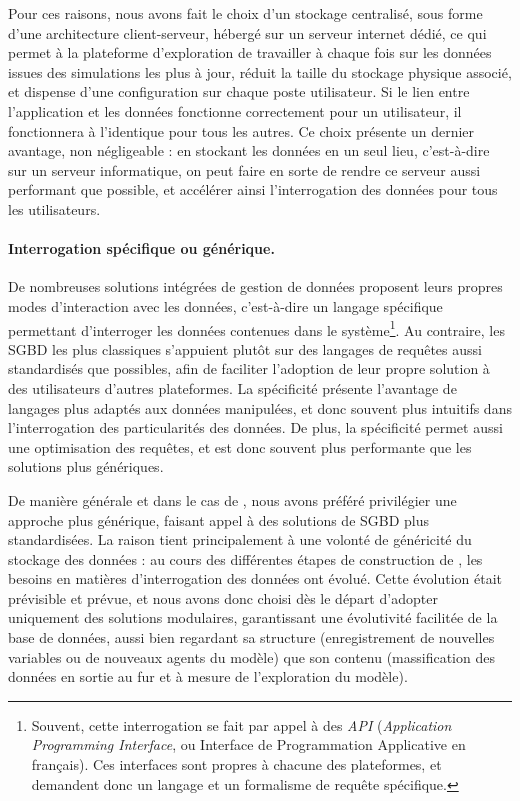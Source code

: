 Pour ces raisons, nous avons fait le choix d'un stockage centralisé, sous forme d'une architecture \og client-serveur\fg{}, hébergé sur un serveur internet dédié, ce qui permet à la plateforme d'exploration de travailler à chaque fois sur les données issues des simulations les plus à jour, réduit la taille du stockage physique associé, et dispense d'une configuration sur chaque poste utilisateur.
Si le lien entre l'application et les données fonctionne correctement pour un utilisateur, il fonctionnera à l'identique pour tous les autres.
Ce choix présente un dernier avantage, non négligeable :
en stockant les données en un seul lieu, c'est-à-dire sur un serveur informatique, on peut faire en sorte de rendre ce serveur aussi performant que possible, et accélérer ainsi l'interrogation des données pour tous les utilisateurs.

\paragraph{Interrogation spécifique ou générique.}\label{par:interrogation-generique}

De nombreuses solutions intégrées de gestion de données proposent leurs propres modes d'interaction avec les données, c'est-à-dire un langage spécifique permettant d'interroger les données contenues dans le système\footnote{
	Souvent, cette interrogation se fait par appel à des \textit{API} (\textit{Application Programming Interface}, ou Interface de Programmation Applicative en français).
	Ces interfaces sont propres à chacune des plateformes, et demandent donc un langage et un formalisme de requête spécifique.
}.
Au contraire, les SGBD les plus classiques s'appuient plutôt sur des langages de requêtes aussi standardisés que possibles, afin de faciliter l'adoption de leur propre solution à des utilisateurs d'autres plateformes.
La spécificité présente l'avantage de langages plus adaptés aux données manipulées, et donc souvent plus intuitifs dans l'interrogation des particularités des données.
De plus, la spécificité permet aussi une optimisation des requêtes, et est donc souvent plus performante que les solutions plus génériques.

De manière générale et dans le cas de \simfeodal{}, nous avons préféré privilégier une approche plus générique, faisant appel à des solutions de SGBD plus standardisées.
La raison tient principalement à une volonté de généricité du stockage des données : au cours des différentes étapes de construction de \simfeodal{}, les besoins en matières d'interrogation des données ont évolué.
Cette évolution était prévisible et prévue, et nous avons donc choisi dès le départ d'adopter uniquement des solutions modulaires, garantissant une évolutivité facilitée de la base de données, aussi bien regardant sa structure (enregistrement de nouvelles variables ou de nouveaux agents du modèle) que son contenu (massification des données en sortie au fur et à mesure de l'exploration du modèle).

